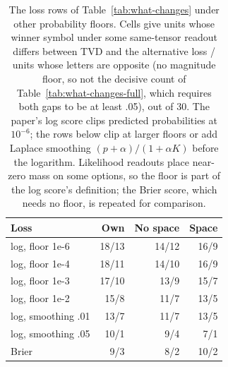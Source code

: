 \begin{table}[t]
\centering\scriptsize
\setlength{\tabcolsep}{4pt}
\begin{tabular}{@{}lrrr@{}}
\toprule
Loss & Own & No space & Space \\
\midrule
log, floor 1e-6 & 18/13 & 14/12 & 16/9 \\
log, floor 1e-4 & 18/11 & 14/10 & 16/9 \\
log, floor 1e-3 & 17/10 & 13/9 & 15/7 \\
log, floor 1e-2 & 15/8 & 11/7 & 13/5 \\
log, smoothing .01 & 13/7 & 11/7 & 13/5 \\
log, smoothing .05 & 10/1 & 9/4 & 7/1 \\
Brier & 9/3 & 8/2 & 10/2 \\
\bottomrule
\end{tabular}
\caption{The loss rows of Table~\ref{tab:what-changes} under other probability floors. Cells give units whose winner symbol under some same-tensor readout differs between TVD and the alternative loss / units whose letters are opposite (no magnitude floor, so not the decisive count of Table~\ref{tab:what-changes-full}, which requires both gaps to be at least .05), out of 30. The paper's log score clips predicted probabilities at $10^{-6}$; the rows below clip at larger floors or add Laplace smoothing $(p+\alpha)/(1+\alpha K)$ before the logarithm. Likelihood readouts place near-zero mass on some options, so the floor is part of the log score's definition; the Brier score, which needs no floor, is repeated for comparison.}
\label{tab:log-floor}
\end{table}
